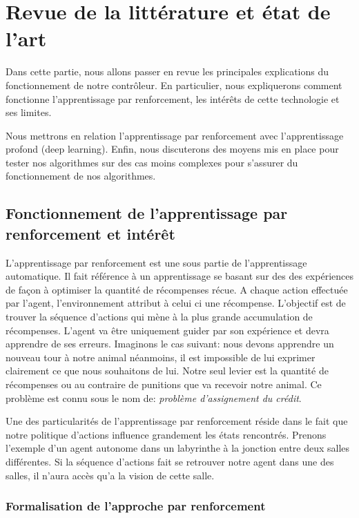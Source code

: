 \newpage
\section{Revue de la littérature et état de l'art}

Dans cette partie, nous allons passer en revue les principales explications du fonctionnement de notre contrôleur. 
En particulier, nous expliquerons comment fonctionne l'apprentissage par renforcement, les intérêts de cette technologie et ses limites.  

Nous mettrons en relation l'apprentissage par renforcement avec l'apprentissage profond (deep learning).
Enfin, nous discuterons des moyens mis en place pour tester nos algorithmes sur des cas moins complexes pour s'assurer du fonctionnement de nos algorithmes.

\subsection{Fonctionnement de l'apprentissage par renforcement et intérêt}

L'apprentissage par renforcement est une sous partie de l'apprentissage automatique. Il fait référence à un apprentissage se basant sur des des expériences de façon à optimiser la quantité de récompenses récue. A chaque action effectuée par l'agent, l'environnement attribut à celui ci une récompense. L'objectif est de trouver la séquence d'actions qui mène à la plus grande accumulation de récompenses. L'agent va être uniquement guider par son expérience et devra apprendre de ses erreurs. Imaginons le cas suivant: nous devons apprendre un nouveau tour à notre animal néanmoins, il est impossible de lui exprimer clairement ce que nous souhaitons de lui. Notre seul levier est la quantité de récompenses ou au contraire de punitions que va recevoir notre animal. Ce problème est connu sous le nom de: \emph{problème d'assignement du crédit}. 

Une des particularités de l'apprentissage par renforcement réside dans le fait que notre politique d'actions influence grandement les états rencontrés. Prenons l'exemple d'un agent autonome dans un labyrinthe à la jonction entre deux salles différentes. Si la séquence d'actions fait se retrouver notre agent dans une des salles, il n'aura accès qu'a la vision de cette salle.

\subsubsection{Formalisation de l'approche par renforcement}

